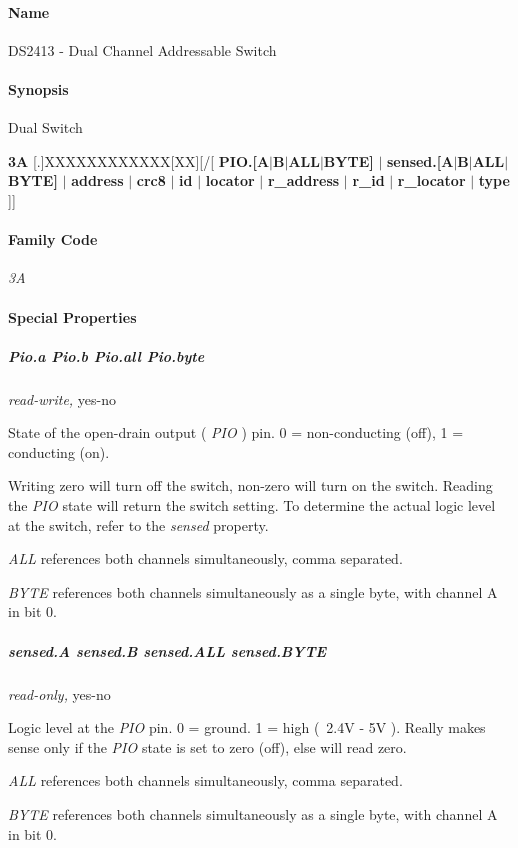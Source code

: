 \paragraph*{Name}
DS2413 - Dual Channel Addressable Switch 
\paragraph*{Synopsis}
Dual Switch


\textbf{3A} [.]XXXXXXXXXXXX[XX][/[ \textbf{PIO.[A$|$B$|$ALL$|$BYTE]} $|$ \textbf{sensed.[A$|$B$|$ALL$|$BYTE]} $|$           \textbf{address}
$|$ \textbf{crc8} $|$ \textbf{id} $|$ \textbf{locator} $|$ \textbf{r\_address} $|$ \textbf{r\_id} $|$ \textbf{r\_locator} $|$ \textbf{type}  ]] 
\paragraph*{Family Code}


\textit{3A}

\paragraph*{Special Properties}

\subparagraph*{Pio.a Pio.b Pio.all Pio.byte}\textit{read-write,} yes-no 

State of the open-drain output ( \textit{PIO} ) pin. 0 = non-conducting (off), 1 =
\textsf{conducting (on)}. 

Writing zero will turn off the switch, non-zero will turn on the switch.
Reading the \textit{PIO} state will return the switch setting. To determine the actual
logic level at the switch, refer to the \textit{sensed} property. 

\textit{ALL} references both channels simultaneously, comma separated. 

\textit{BYTE} references both channels simultaneously as a single byte, with channel
A in bit 0. 
\subparagraph*{sensed.A sensed.B sensed.ALL sensed.BYTE}\textit{read-only,} yes-no 

Logic level at the \textit{PIO} pin. 0 = ground. 1 = high (~2.4V - 5V ). Really makes
sense only if the \textit{PIO} state is set to zero (off), else will read zero. 

\textit{ALL} references both channels simultaneously, comma separated. 

\textit{BYTE} references both channels simultaneously as a single byte, with channel
A in bit 0. 
